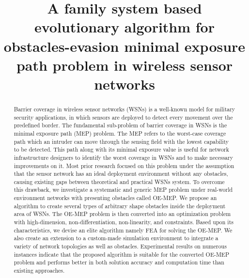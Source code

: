 \documentclass[final]{elsarticle}
\begin{document}
\begin{frontmatter}
\title{A family system based evolutionary algorithm for obstacles-evasion minimal exposure path problem in wireless sensor networks}


%
%
\begin{abstract}
Barrier coverage in wireless sensor networks (WSNs) is a well-known model for military security applications, in which sensors are deployed to detect every movement over the predefined border. The fundamental sub-problem of barrier coverage in WSNs is the minimal exposure path (MEP) problem. The MEP refers to the worst-case coverage path which an intruder can move through the sensing field with the lowest capability to be detected. This path along with its minimal exposure value is useful for network infrastructure designers to identify the worst coverage in WSNs and to make necessary improvements on it. Most prior research focused on this problem under the assumption that the sensor network has an ideal deployment environment without any obstacles, causing existing gaps between theoretical and practical WSNs system. To overcome this drawback, we investigate a systematic and generic MEP problem under real-world environment networks with presenting obstacles called OE-MEP. We propose an algorithm to create several types of arbitrary shape obstacles inside the deployment area of WSNs. The OE-MEP problem is then converted into an optimization problem with high-dimension, non-differentiation, non-linearity, and constraints. Based upon its characteristics, we devise an elite algorithm namely FEA for solving the OE-MEP. We also create an extension to a custom-made simulation environment to integrate a variety of network topologies as well as obstacles. Experimental results on numerous instances indicate that the proposed algorithm is suitable for the converted OE-MEP problem and performs better in both solution accuracy and computation time than existing approaches.
  

\end{abstract}
\end{frontmatter}
\end{document}
